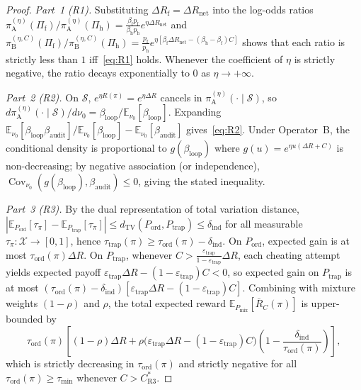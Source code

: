 \documentclass[11pt,a4paper]{article}
\newcommand{\E}{\mathbb{E}}
\newcommand{\Cov}{\operatorname{Cov}}
\newcommand{\dTV}{d_{\mathrm{TV}}}
\begin{document}
\begin{proof}
\emph{Part~1 (R1).} Substituting $\Delta R_{\mathrm{f}} = \Delta R_{\mathrm{net}}$ into the log-odds ratios $\pi_{\mathrm{A}}^{(\eta)}(\Pi_{\mathrm{f}})/\pi_{\mathrm{A}}^{(\eta)}(\Pi_{\mathrm{h}}) = \frac{\beta_{\mathrm{f}} p_{\mathrm{f}}}{\beta_{\mathrm{h}} p_{\mathrm{h}}} e^{\eta \Delta R_{\mathrm{net}}}$ and $\pi_{\mathrm{B}}^{(\eta, C)}(\Pi_{\mathrm{f}})/\pi_{\mathrm{B}}^{(\eta, C)}(\Pi_{\mathrm{h}}) = \frac{p_{\mathrm{f}}}{p_{\mathrm{h}}} e^{\eta[\beta_{\mathrm{f}}\Delta R_{\mathrm{net}} - (\beta_{\mathrm{h}}-\beta_{\mathrm{f}})C]}$ shows that each ratio is strictly less than $1$ iff~\eqref{eq:R1} holds. Whenever the coefficient of $\eta$ is strictly negative, the ratio decays exponentially to $0$ as $\eta \to +\infty$.

\emph{Part~2 (R2).} On $\mathcal{S}$, $e^{\eta R(\pi)} = e^{\eta \Delta R}$ cancels in $\pi_{\mathrm{A}}^{(\eta)}(\cdot \mid \mathcal{S})$, so $d\pi_{\mathrm{A}}^{(\eta)}(\cdot \mid \mathcal{S})/d\nu_0 = \beta_{\mathrm{loop}} / \E_{\nu_0}[\beta_{\mathrm{loop}}]$. Expanding $\E_{\nu_0}[\beta_{\mathrm{loop}}\beta_{\mathrm{audit}}]/\E_{\nu_0}[\beta_{\mathrm{loop}}] - \E_{\nu_0}[\beta_{\mathrm{audit}}]$ gives~\eqref{eq:R2}. Under Operator~B, the conditional density is proportional to $g(\beta_{\mathrm{loop}})$ where $g(u) = e^{\eta u (\Delta R + C)}$ is non-decreasing; by negative association (or independence), $\Cov_{\nu_0}(g(\beta_{\mathrm{loop}}), \beta_{\mathrm{audit}}) \le 0$, giving the stated inequality.

\emph{Part~3 (R3).} By the dual representation of total variation distance, $|\E_{P_{\mathrm{ord}}}[\tau_\pi] - \E_{P_{\mathrm{trap}}}[\tau_\pi]| \le \dTV(P_{\mathrm{ord}}, P_{\mathrm{trap}}) \le \delta_{\mathrm{ind}}$ for all measurable $\tau_\pi : \mathcal{X} \to [0, 1]$, hence $\tau_{\mathrm{trap}}(\pi) \ge \tau_{\mathrm{ord}}(\pi) - \delta_{\mathrm{ind}}$. On $P_{\mathrm{ord}}$, expected gain is at most $\tau_{\mathrm{ord}}(\pi)\Delta R$. On $P_{\mathrm{trap}}$, whenever $C > \frac{\varepsilon_{\mathrm{trap}}}{1-\varepsilon_{\mathrm{trap}}}\Delta R$, each cheating attempt yields expected payoff $\varepsilon_{\mathrm{trap}}\Delta R - (1-\varepsilon_{\mathrm{trap}})C < 0$, so expected gain on $P_{\mathrm{trap}}$ is at most $(\tau_{\mathrm{ord}}(\pi) - \delta_{\mathrm{ind}})[\varepsilon_{\mathrm{trap}}\Delta R - (1-\varepsilon_{\mathrm{trap}})C]$. Combining with mixture weights $(1-\rho)$ and $\rho$, the total expected reward $\E_{P_{\mathrm{mix}}}[\bar{R}_C(\pi)]$ is upper-bounded by
\[
  \tau_{\mathrm{ord}}(\pi)\left[(1-\rho)\Delta R + \rho\big(\varepsilon_{\mathrm{trap}}\Delta R - (1-\varepsilon_{\mathrm{trap}})C\big)\left(1 - \frac{\delta_{\mathrm{ind}}}{\tau_{\mathrm{ord}}(\pi)}\right)\right],
\]
which is strictly decreasing in $\tau_{\mathrm{ord}}(\pi)$ and strictly negative for all $\tau_{\mathrm{ord}}(\pi) \ge \tau_{\min}$ whenever $C > C_{\mathrm{R3}}^*$.
\end{proof}
\end{document}
